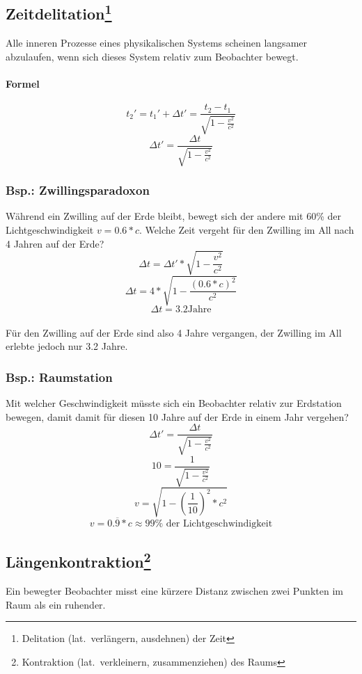 \documentclass[a4paper,11pt]{article}
\begin{document}
\newpage
\subsection[Zeitdelitation]{Zeitdelitation\footnote{Delitation (lat.\ verlängern, ausdehnen) der Zeit}}
Alle inneren Prozesse eines physikalischen Systems scheinen langsamer abzulaufen, wenn sich dieses System relativ zum Beobachter bewegt.

\paragraph{Formel}
$$t_2' = t_1' + \Delta t' = \frac{t_2 - t_1}{\sqrt{1 - \frac{v^2}{c^2}}}$$
$$\Delta t' = \frac{\Delta t}{\sqrt{1 - \frac{v^2}{c^2}}}$$
\vspace{0.8 em}

\subsubsection{Bsp.: Zwillingsparadoxon}
Während ein Zwilling auf der Erde bleibt, bewegt sich der andere mit 60\% der Lichtgeschwindigkeit $v = 0.6 * c$.
Welche Zeit vergeht für den Zwilling im All nach 4 Jahren auf der Erde?
$$\Delta t = \Delta t' * \sqrt{1 - \frac{v^2}{c^2}}$$
$$\Delta t = 4 * \sqrt{1 - \frac{{(0.6 * c)}^2}{c^2}}$$
$$\Delta t = 3.2 \text{Jahre}$$
\vspace{0.8 em}\\
Für den Zwilling auf der Erde sind also 4 Jahre vergangen, der Zwilling im All erlebte jedoch nur 3.2 Jahre.

\subsubsection{Bsp.: Raumstation}
Mit welcher Geschwindigkeit müsste sich ein Beobachter relativ zur Erdstation bewegen, damit damit für diesen 10 Jahre auf der Erde in einem Jahr vergehen?
$$\Delta t' = \frac{\Delta t}{\sqrt{1 - \frac{v^2}{c^2}}}$$
$$10 = \frac{1}{\sqrt{1 - \frac{v^2}{c^2}}}$$
$$v = \sqrt{1 - {(\frac{1}{10})}^2 * c^2}$$
\vspace{0.8 em}
$$v = 0.\overline{9} * c \approx 99\% \text{ der Lichtgeschwindigkeit}$$

\newpage
\subsection[Längenkontraktion]{Längenkontraktion\footnote{Kontraktion (lat.\ verkleinern, zusammenziehen) des Raums}}
Ein bewegter Beobachter misst eine kürzere Distanz zwischen zwei Punkten im Raum als ein ruhender.
\end{document}
